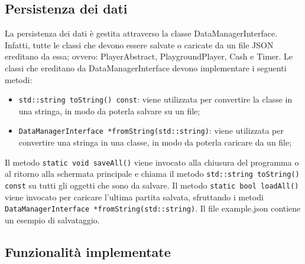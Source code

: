 \documentclass[11pt]{article}
\begin{document}
\subsection{Persistenza dei dati}

La persistenza dei dati è gestita attraverso la classe DataManagerInterface.
Infatti, tutte le classi che devono essere salvate o caricate da un file JSON
ereditano da essa; ovvero: PlayerAbstract, PlaygroundPlayer, Cash e Timer.
Le classi che ereditano da DataManagerInterface devono implementare i seguenti
metodi:
\begin{itemize}
	\item \lstinline|std::string toString() const|: viene utilizzata per 
		convertire la classe in una stringa, in modo da poterla salvare su un 
		file;

	\item \lstinline|DataManagerInterface *fromString(std::string)|: viene 
		utilizzata per convertire una stringa in una classe, in modo da poterla 
		caricare da un file;
\end{itemize}

Il metodo \lstinline|static void saveAll()| viene invocato alla chiusura del 
programma o al ritorno alla schermata principale e chiama il metodo
\lstinline|std::string toString() const| su tutti
gli oggetti che sono da salvare. Il metodo \lstinline|static bool loadAll()| 
viene invocato per caricare l'ultima partita salvata, sfruttando i metodi 
\lstinline|DataManagerInterface *fromString(std::string)|. Il file example.json 
contiene un esempio di salvataggio.

\subsection{Funzionalità implementate}
\end{document}
